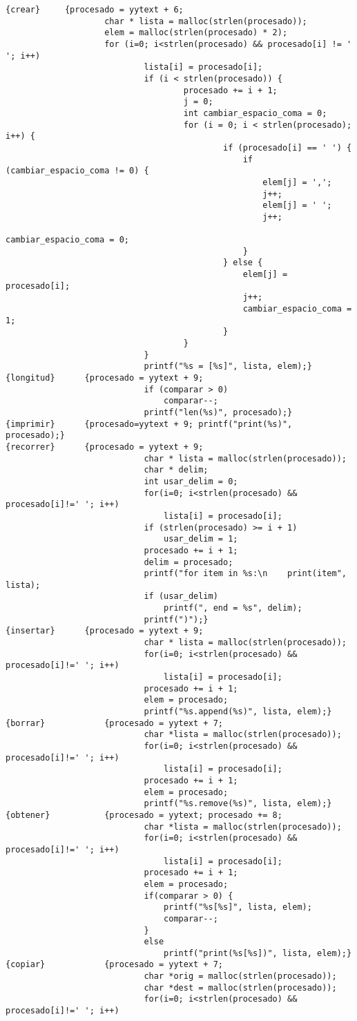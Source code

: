 \documentclass[11pt,a4paper]{article}
\begin{document}
\begin{lstlisting}
{crear}		{procesado = yytext + 6;
					char * lista = malloc(strlen(procesado));
					elem = malloc(strlen(procesado) * 2);
					for (i=0; i<strlen(procesado) && procesado[i] != ' '; i++)
							lista[i] = procesado[i];
							if (i < strlen(procesado)) {
									procesado += i + 1;
									j = 0;
									int cambiar_espacio_coma = 0;
									for (i = 0; i < strlen(procesado); i++) {
											if (procesado[i] == ' ') {
												if (cambiar_espacio_coma != 0) {
													elem[j] = ',';
													j++;
													elem[j] = ' ';
													j++;
													cambiar_espacio_coma = 0;
												}
											} else {
												elem[j] = procesado[i];
												j++;
												cambiar_espacio_coma = 1;
											}
									}
							}
							printf("%s = [%s]", lista, elem);}
{longitud}		{procesado = yytext + 9;
							if (comparar > 0)
								comparar--;
							printf("len(%s)", procesado);}
{imprimir}		{procesado=yytext + 9; printf("print(%s)", procesado);}
{recorrer}		{procesado = yytext + 9;
							char * lista = malloc(strlen(procesado));
							char * delim;
							int usar_delim = 0;
							for(i=0; i<strlen(procesado) && procesado[i]!=' '; i++)
								lista[i] = procesado[i];
							if (strlen(procesado) >= i + 1)
								usar_delim = 1;
							procesado += i + 1;
							delim = procesado;
							printf("for item in %s:\n    print(item", lista);
							if (usar_delim)
								printf(", end = %s", delim);
							printf(")");}
{insertar}		{procesado = yytext + 9;
							char * lista = malloc(strlen(procesado));
							for(i=0; i<strlen(procesado) && procesado[i]!=' '; i++)
								lista[i] = procesado[i];
							procesado += i + 1;
							elem = procesado;
							printf("%s.append(%s)", lista, elem);}
{borrar}			{procesado = yytext + 7;
							char *lista = malloc(strlen(procesado));
							for(i=0; i<strlen(procesado) && procesado[i]!=' '; i++)
								lista[i] = procesado[i];
							procesado += i + 1;
							elem = procesado;
							printf("%s.remove(%s)", lista, elem);}
{obtener}			{procesado = yytext; procesado += 8;
							char *lista = malloc(strlen(procesado));
							for(i=0; i<strlen(procesado) && procesado[i]!=' '; i++)
								lista[i] = procesado[i];
							procesado += i + 1;
							elem = procesado;
							if(comparar > 0) {
								printf("%s[%s]", lista, elem);
								comparar--;
							}
							else
								printf("print(%s[%s])", lista, elem);}
{copiar}			{procesado = yytext + 7;
							char *orig = malloc(strlen(procesado));
							char *dest = malloc(strlen(procesado));
							for(i=0; i<strlen(procesado) && procesado[i]!=' '; i++)

\end{lstlisting}
\end{document}

